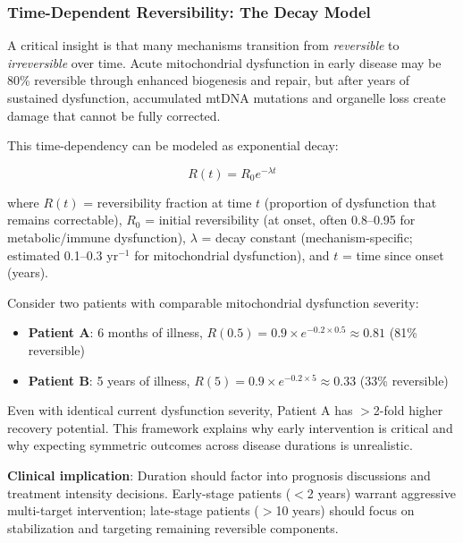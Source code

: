 \subsubsection{Time-Dependent Reversibility: The Decay Model}

A critical insight is that many mechanisms transition from \textit{reversible} to \textit{irreversible} over time. Acute mitochondrial dysfunction in early disease may be 80\% reversible through enhanced biogenesis and repair, but after years of sustained dysfunction, accumulated mtDNA mutations and organelle loss create damage that cannot be fully corrected.

This time-dependency can be modeled as exponential decay:

\begin{equation}
R(t) = R_0 e^{-\lambda t}
\label{eq:reversibility-decay}
\end{equation}

where $R(t)$ = reversibility fraction at time $t$ (proportion of dysfunction that remains correctable), $R_0$ = initial reversibility (at onset, often 0.8--0.95 for metabolic/immune dysfunction), $\lambda$ = decay constant (mechanism-specific; estimated 0.1--0.3 yr$^{-1}$ for mitochondrial dysfunction), and $t$ = time since onset (years).

\begin{example}
Consider two patients with comparable mitochondrial dysfunction severity:
\begin{itemize}
    \item \textbf{Patient A}: 6 months of illness, $R(0.5) = 0.9 \times e^{-0.2 \times 0.5} \approx 0.81$ (81\% reversible)
    \item \textbf{Patient B}: 5 years of illness, $R(5) = 0.9 \times e^{-0.2 \times 5} \approx 0.33$ (33\% reversible)
\end{itemize}
Even with identical current dysfunction severity, Patient A has $>$2-fold higher recovery potential. This framework explains why early intervention is critical and why expecting symmetric outcomes across disease durations is unrealistic.
\end{example}

\textbf{Clinical implication}: Duration should factor into prognosis discussions and treatment intensity decisions. Early-stage patients ($<$2 years) warrant aggressive multi-target intervention; late-stage patients ($>$10 years) should focus on stabilization and targeting remaining reversible components.

